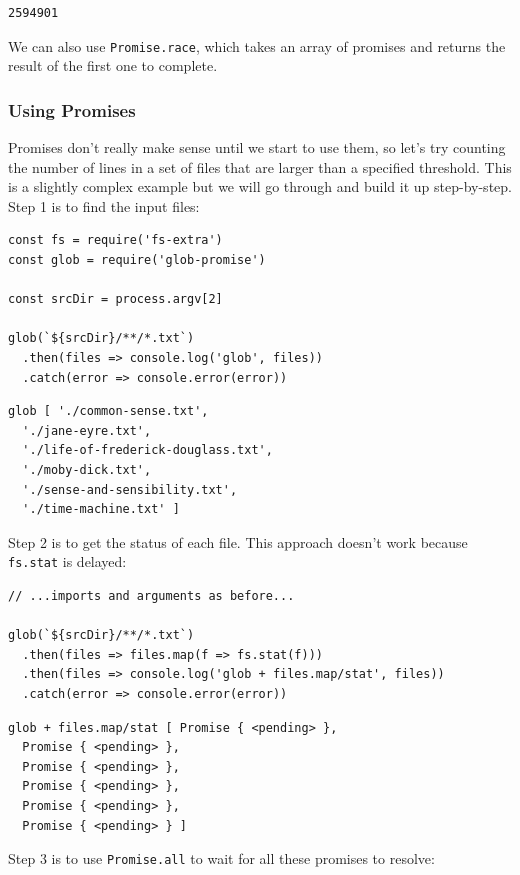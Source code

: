 \begin{verbatim}
2594901
\end{verbatim}

We can also use \texttt{Promise.race}, which takes an array of promises
and returns the result of the first one to complete.

\subsubsection{Using Promises}\label{s:promises-usage}

Promises don't really make sense until we start to use them, so let's
try counting the number of lines in a set of files that are larger than
a specified threshold. This is a slightly complex example but we will go
through and build it up step-by-step. Step 1 is to find the input files:

\begin{verbatim}
const fs = require('fs-extra')
const glob = require('glob-promise')

const srcDir = process.argv[2]

glob(`${srcDir}/**/*.txt`)
  .then(files => console.log('glob', files))
  .catch(error => console.error(error))
\end{verbatim}

\begin{verbatim}
glob [ './common-sense.txt',
  './jane-eyre.txt',
  './life-of-frederick-douglass.txt',
  './moby-dick.txt',
  './sense-and-sensibility.txt',
  './time-machine.txt' ]
\end{verbatim}

Step 2 is to get the status of each file. This approach doesn't work
because \texttt{fs.stat} is delayed:

\begin{verbatim}
// ...imports and arguments as before...

glob(`${srcDir}/**/*.txt`)
  .then(files => files.map(f => fs.stat(f)))
  .then(files => console.log('glob + files.map/stat', files))
  .catch(error => console.error(error))
\end{verbatim}

\begin{verbatim}
glob + files.map/stat [ Promise { <pending> },
  Promise { <pending> },
  Promise { <pending> },
  Promise { <pending> },
  Promise { <pending> },
  Promise { <pending> } ]
\end{verbatim}

Step 3 is to use \texttt{Promise.all} to wait for all these promises to
resolve:


